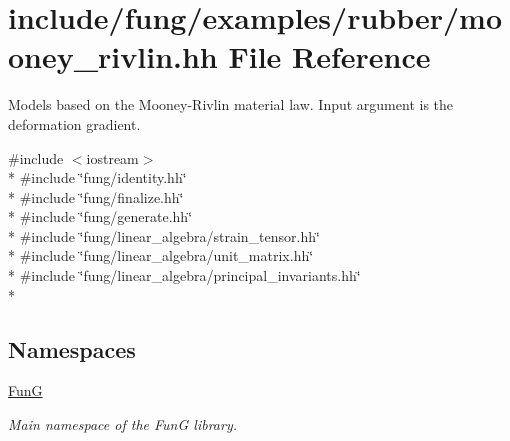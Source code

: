 \hypertarget{mooney__rivlin_8hh}{\section{include/fung/examples/rubber/mooney\-\_\-rivlin.hh File Reference}
\label{mooney__rivlin_8hh}
}


Models based on the Mooney-\/\-Rivlin material law. Input argument is the deformation gradient.  


{\ttfamily \#include $<$iostream$>$}\\*
{\ttfamily \#include \char`\"{}fung/identity.\-hh\char`\"{}}\\*
{\ttfamily \#include \char`\"{}fung/finalize.\-hh\char`\"{}}\\*
{\ttfamily \#include \char`\"{}fung/generate.\-hh\char`\"{}}\\*
{\ttfamily \#include \char`\"{}fung/linear\-\_\-algebra/strain\-\_\-tensor.\-hh\char`\"{}}\\*
{\ttfamily \#include \char`\"{}fung/linear\-\_\-algebra/unit\-\_\-matrix.\-hh\char`\"{}}\\*
{\ttfamily \#include \char`\"{}fung/linear\-\_\-algebra/principal\-\_\-invariants.\-hh\char`\"{}}\\*
\subsection*{Namespaces}
\begin{DoxyCompactItemize}
\item 
\hyperlink{namespaceFunG}{Fun\-G}
\begin{DoxyCompactList}\small\item\em Main namespace of the Fun\-G library. \end{DoxyCompactList}\end{DoxyCompactItemize}
